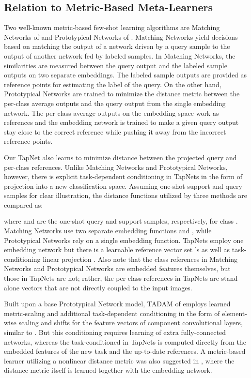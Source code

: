 \documentclass{article}
\begin{document}
\subsection{Relation to Metric-Based Meta-Learners}
Two well-known metric-based few-shot learning algorithms are Matching Networks of \cite{MN} and Prototypical Networks of \cite{PN}. Matching Networks yield decisions based on matching the output of a network driven by a query sample to the output of another network fed by labeled samples. In Matching Networks, the similarities are measured between the query output and the labeled sample outputs on two separate embeddings. The labeled sample outputs are provided as reference points for estimating the label of the query. On the other hand, Prototypical Networks are trained to minimize the distance metric between the per-class average outputs and the query output from the single embedding network.
The per-class average outputs on the embedding space work as references 
and the embedding network is trained to make a given query output stay close to the correct reference while pushing it 
away from the incorrect reference points.

Our TapNet also learns to minimize distance between the projected query and per-class references. Unlike Matching Networks and Prototypical Networks, however, there is explicit task-dependent conditioning in TapNets in the form of projection into a new classification space. Assuming one-shot support and query samples for clear illustration, the distance functions utilized by three methods are compared as:

where  and  are the one-shot query and support samples, respectively, for class . Matching Networks
use two separate embedding functions  and , while Prototypical Networks rely on a single embedding function. TapNets employ one embedding network but there is a learnable reference vector set 's as well as task-conditioning linear projection . Also note that the class references in Matching Networks and Prototypical Networks are embedded features themselves, but
those in TapNets are not; rather, the per-class references in TapNets are stand-alone vectors that are not directly coupled to the input images.   

Built upon a base Prototypical Network model, TADAM of \cite{TADAM} employs learned metric-scaling and additional task-dependent conditioning in the form of element-wise scaling and shifts for the feature vectors of component convolutional layers, similar to \cite{FILM}. But this conditioning requires learning of extra fully-connected networks, whereas the task-conditioned  in TapNets is computed directly from the embedded features of the new task and the up-to-date references. A metric-based learner utilizing a nonlinear distance metric was also suggested in \cite{Yang}, where the distance metric itself is learned together with the embedding network.  
\end{document}
